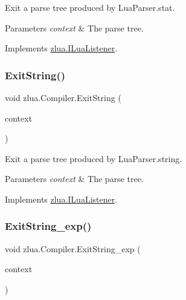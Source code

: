 Exit a parse tree produced by Lua\+Parser.\+stat. 


\begin{DoxyParams}{Parameters}
{\em context} & The parse tree.\\
\hline
\end{DoxyParams}


Implements \mbox{\hyperlink{interfacezlua_1_1_i_lua_listener_adb5cede64711480ae76ce5eece644ee4}{zlua.\+I\+Lua\+Listener}}.

\mbox{\label{classzlua_1_1_compiler_ac491501f1dcb06e396453c15c20fa5b8}} 
\subsubsection{\texorpdfstring{Exit\+String()}{ExitString()}}
{\footnotesize\ttfamily void zlua.\+Compiler.\+Exit\+String (\begin{DoxyParamCaption}\item[{\mbox{[}\+Not\+Null\mbox{]} \mbox{\hyperlink{classzlua_1_1_lua_parser_1_1_string_context}{Lua\+Parser.\+String\+Context}}}]{context }\end{DoxyParamCaption})}



Exit a parse tree produced by Lua\+Parser.\+string. 


\begin{DoxyParams}{Parameters}
{\em context} & The parse tree.\\
\hline
\end{DoxyParams}


Implements \mbox{\hyperlink{interfacezlua_1_1_i_lua_listener_afc8e259f5d8629fd2fd800f847dd62a6}{zlua.\+I\+Lua\+Listener}}.

\mbox{\label{classzlua_1_1_compiler_aa552695cd135ecaed2b17482560dd97d}} 
\subsubsection{\texorpdfstring{Exit\+String\+\_\+exp()}{ExitString\_exp()}}
{\footnotesize\ttfamily void zlua.\+Compiler.\+Exit\+String\+\_\+exp (\begin{DoxyParamCaption}\item[{\mbox{[}\+Not\+Null\mbox{]} \mbox{\hyperlink{classzlua_1_1_lua_parser_1_1_string__exp_context}{Lua\+Parser.\+String\+\_\+exp\+Context}}}]{context }\end{DoxyParamCaption})}



